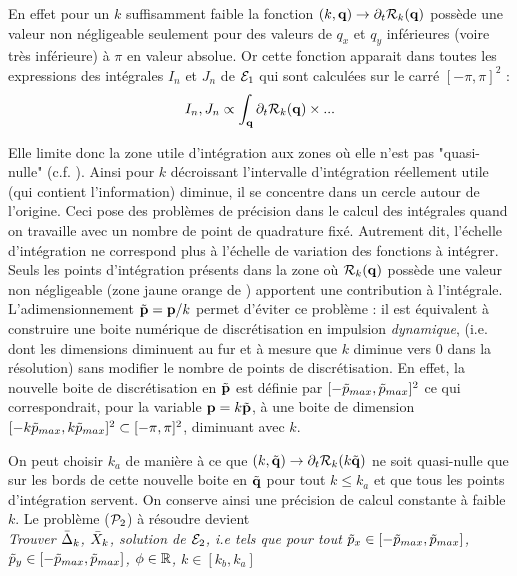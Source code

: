 \documentclass[10.5pt]{article}
\begin{document}
\begin{multicols}{2}
\begin{figure}[H]
\label{fig:DerRegIsing}
\end{figure}
En effet pour un $k$ suffisamment faible la fonction $(k,{\bf q}) \to \partial_t \mathcal{R}_k({\bf q})$ possède une valeur non négligeable seulement pour des valeurs de $q_x$ et $q_y$ inférieures (voire très inférieure) à $\pi$ en valeur absolue. Or cette fonction apparait dans toutes les expressions des intégrales $I_n$ et $J_n$ de $\mathcal{E}_1$ qui sont calculées sur le carré $[-\pi, \pi]^2$ : 
\begin{equation}
	I_n, J_n \propto \int_{\bf q} \partial_t \mathcal{R}_k({\bf q})\times ... 
\end{equation}

Elle limite donc la zone utile d'intégration aux zones où elle n'est pas "quasi-nulle" (c.f. ). Ainsi pour $k$ décroissant l'intervalle d'intégration réellement utile (qui contient l'information) diminue, il se concentre dans un cercle autour de l'origine. Ceci pose des problèmes de précision dans le calcul des intégrales quand on travaille avec un nombre de point de quadrature fixé. Autrement dit, l'échelle d'intégration ne correspond plus à l'échelle de variation des fonctions à intégrer. Seuls les points d'intégration présents dans la zone où $\mathcal{R}_k({\bf q})$ possède une valeur non négligeable (zone jaune orange de ) apportent une contribution à l'intégrale. \\
\indent
L'adimensionnement $\tilde{{\bf p}} = {\bf p}/k$ permet d'éviter ce problème : il est équivalent à construire une boite numérique de discrétisation en impulsion \textit{dynamique}, (i.e. dont les dimensions diminuent au fur et à mesure que $k$ diminue vers $0$ dans la résolution) sans modifier le nombre de points de discrétisation. 
En effet, la nouvelle boite de discrétisation en $\tilde{{\bf p}}$ est définie par $[-\tilde{p}_{max}, \tilde{p}_{max}]^2$ ce qui correspondrait, pour la variable ${\bf p}= k\tilde{{\bf p}}$, à une boite de dimension $[-k\tilde{p}_{max}, k\tilde{p}_{max}]^2 \subset [-\pi, \pi]^2$, diminuant avec $k$.


On peut choisir $k_a$ de manière à ce que $(k,\tilde{{\bf q}}) \to \partial_t \mathcal{R}_k(k\tilde{{\bf q}})$ ne soit quasi-nulle que sur les bords de cette nouvelle boite en $\tilde{{\bf q}}$ pour tout $k \le k_a$ et que tous les points d'intégration servent. On conserve ainsi une précision de calcul constante à faible $k$. Le problème ($\mathcal{P}_2$) à résoudre devient \\


\noindent
{\itshape Trouver $\bar{\Delta}_k$, $\bar{X}_k$, solution de $\mathcal{E}_2$, i.e tels que pour tout $\tilde{p}_x \in [-\tilde{p}_{max}, \tilde{p}_{max}]$, $\tilde{p}_y \in [-\tilde{p}_{max}, \tilde{p}_{max}]$, $\phi \in \mathbb{R}$, $k\in [k_b, k_a]$}


\end{multicols}
\end{document}
